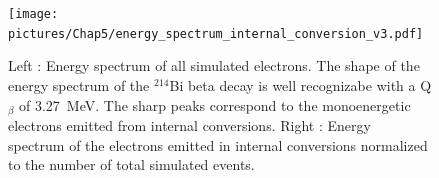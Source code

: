 \documentclass[main.tex]{subfiles}
\begin{document}
\begin{figure}[h!]
\begin{center}
\texttt{[image: pictures/Chap5/energy\_spectrum\_internal\_conversion\_v3.pdf]}
\caption{Left : Energy spectrum of all simulated electrons. The shape of the energy spectrum of the $^{214}$Bi beta decay is well recognizabe with a Q$_\beta$ of 3.27~MeV. The sharp peaks correspond to the monoenergetic electrons emitted from internal conversions. Right : Energy spectrum of the electrons emitted in internal conversions normalized to the number of total simulated events.}
\label{energyspectrumallelectron}
\end{center}
\end{figure}


\end{document}
